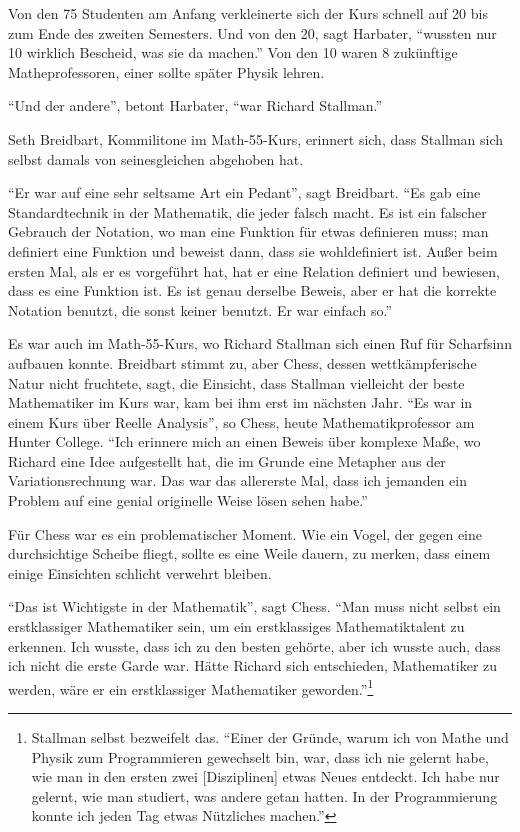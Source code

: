 Von den 75 Studenten am Anfang verkleinerte sich der Kurs schnell auf 20 bis zum Ende des zweiten Semesters. Und von den 20, sagt Harbater, "`wussten nur 10 wirklich Bescheid, was sie da machen."' Von den 10 waren 8 zukünftige Matheprofessoren, einer sollte später Physik lehren.

"`Und der andere"', betont Harbater, "`war Richard Stallman."'

Seth Breidbart, Kommilitone im Math-55-Kurs, erinnert sich, dass Stallman sich selbst damals von seinesgleichen abgehoben hat.

"`Er war auf eine sehr seltsame Art ein Pedant"', sagt Breidbart. "`Es gab eine Standardtechnik in der Mathematik, die jeder falsch macht. Es ist ein falscher Gebrauch der Notation, wo man eine Funktion für etwas definieren muss; man definiert eine Funktion und beweist dann, dass sie wohldefiniert ist. Außer beim ersten Mal, als er es vorgeführt hat, hat er eine Relation definiert und bewiesen, dass es eine Funktion ist. Es ist genau derselbe Beweis, aber er hat die korrekte Notation benutzt, die sonst keiner benutzt. Er war einfach so."'

Es war auch im Math-55-Kurs, wo Richard Stallman sich einen Ruf für Scharfsinn aufbauen konnte. Breidbart stimmt zu, aber Chess, dessen wettkämpferische Natur nicht fruchtete, sagt, die Einsicht, dass Stallman vielleicht der beste Mathematiker im Kurs war, kam bei ihm erst im nächsten Jahr. "`Es war in einem Kurs über Reelle Analysis"', so Chess, heute Mathematikprofessor am Hunter College. "`Ich erinnere mich an einen Beweis über komplexe Maße, wo Richard eine Idee aufgestellt hat, die im Grunde eine Metapher aus der Variationsrechnung war. Das war das allererste Mal, dass ich jemanden ein Problem auf eine genial originelle Weise lösen sehen habe."'

Für Chess war es ein problematischer Moment. Wie ein Vogel, der gegen eine durchsichtige Scheibe fliegt, sollte es eine Weile dauern, zu merken, dass einem einige Einsichten schlicht verwehrt bleiben.

"`Das ist Wichtigste in der Mathematik"', sagt Chess. "`Man muss nicht selbst ein erstklassiger Mathematiker sein, um ein erstklassiges Mathematiktalent zu erkennen. Ich wusste, dass ich zu den besten gehörte, aber ich wusste auch, dass ich nicht die erste Garde war. Hätte Richard sich entschieden, Mathematiker zu werden, wäre er ein erstklassiger Mathematiker geworden."'\footnote{Stallman selbst bezweifelt das. "`Einer der Gründe, warum ich von Mathe und Physik zum Programmieren gewechselt bin, war, dass ich nie gelernt habe, wie man in den ersten zwei [Disziplinen] etwas Neues entdeckt. Ich habe nur gelernt, wie man studiert, was andere getan hatten. In der Programmierung konnte ich jeden Tag etwas Nützliches machen."'}

